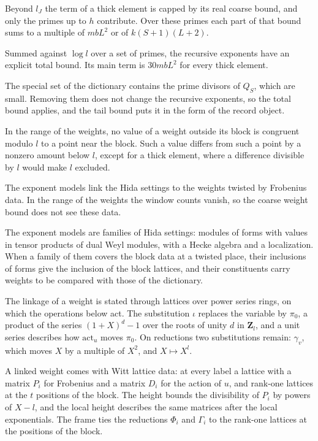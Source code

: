 Beyond $l_J$ the term of a thick element is capped by its real coarse bound, and only the primes up to
$h$ contribute. Over these primes each part of that bound sums to a multiple of $mbL^2$ or of
$k(S+1)(L+2)$.

Summed against $\log l$ over a set of primes, the recursive exponents have an explicit total bound. Its
main term is $30mbL^2$ for every thick element.

The special set of the dictionary contains the prime divisors of $Q_S$, which are small. Removing them
does not change the recursive exponents, so the total bound applies, and the tail bound puts it in the
form of the record object.

In the range of the weights, no value of a weight outside its block is congruent modulo $l$ to a point
near the block. Such a value differs from such a point by a nonzero amount below $l$, except for a
thick element, where a difference divisible by $l$ would make $l$ excluded.

The exponent models link the Hida settings to the weights twisted by Frobenius data. In the range of
the weights the window counts vanish, so the coarse weight bound does not see these data.

The exponent models are families of Hida settings: modules of forms with values in tensor products of
dual Weyl modules, with a Hecke algebra and a localization. When a family of them covers the block
data at a twisted place, their inclusions of forms give the inclusion of the block lattices, and their
constituents carry weights to be compared with those of the dictionary.

The linkage of a weight is stated through lattices over power series rings, on which the operations
below act. The substitution $\iota$ replaces the variable by $\pi_0$, a product of the series
$(1+X)^d-1$ over the roots of unity $d$ in $\mathbf Z_l$, and a unit series describes how
$\mathrm{act}_u$ moves $\pi_0$. On reductions two substitutions remain: $\gamma_v$, which moves $X$ by a
multiple of $X^2$, and $X\mapsto X^l$.

A linked weight comes with Witt lattice data: at every label a lattice with a matrix $P_i$ for Frobenius
and a matrix $D_i$ for the action of $u$, and rank-one lattices at the $t$ positions of the block. The
height bounds the divisibility of $P_i$ by powers of $X-l$, and the local height describes the same
matrices after the local exponentials. The frame ties the reductions $\Phi_i$ and $\Gamma_i$ to the
rank-one lattices at the positions of the block.

